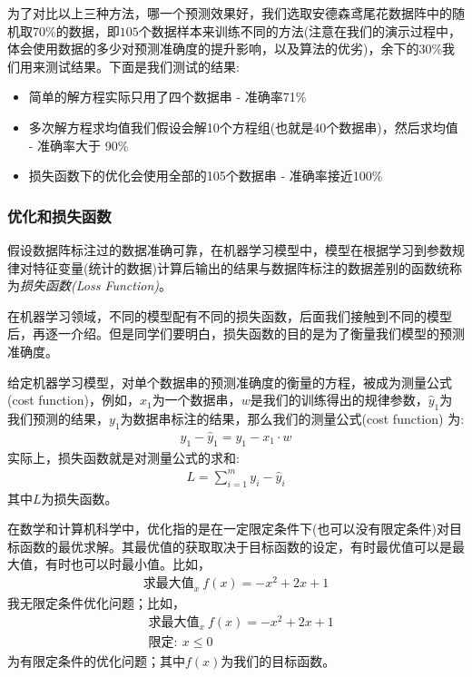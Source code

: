 \documentclass[12pt]{article}
\numberwithin{figure}{section}
\numberwithin{equation}{section}
\begin{document}
为了对比以上三种方法，哪一个预测效果好，我们选取安德森鸢尾花数据阵中的随机取70\%的数据，即$105$个数据样本来训练不同的方法(注意在我们的演示过程中，体会使用数据的多少对预测准确度的提升影响，以及算法的优劣)，余下的30\%我们用来测试结果。下面是我们测试的结果:
\begin{itemize}
	\item 简单的解方程实际只用了四个数据串 - 准确率71\%
	\item 多次解方程求均值我们假设会解10个方程组(也就是40个数据串)，然后求均值 - 准确率大于 90\%
	\item 损失函数下的优化会使用全部的105个数据串 - 准确率接近100\%
\end{itemize}

\subsubsection{优化和损失函数}

\begin{definition}
	假设数据阵标注过的数据准确可靠，在机器学习模型中，模型在根据学习到参数规律对特征变量(统计的数据)计算后输出的结果与数据阵标注的数据差别的函数统称为\textit{损失函数(Loss Function)}。
\end{definition}

\begin{remark}
在机器学习领域，不同的模型配有不同的损失函数，后面我们接触到不同的模型后，再逐一介绍。但是同学们要明白，损失函数的目的是为了衡量我们模型的预测准确度。	
\end{remark}

\begin{definition}
	给定机器学习模型，对单个数据串的预测准确度的衡量的方程，被成为测量公式(cost function)，例如，$x_1$为一个数据串，$w$是我们的训练得出的规律参数，$\hat{y}_1$为我们预测的结果，$y_1$为数据串标注的结果，那么我们的测量公式(cost function) 为:
	\begin{align*}
		y_1 - \hat{y}_1 = y_1 - x_1 \cdot w 
	\end{align*}
	实际上，损失函数就是对测量公式的求和:
	\begin{align*}
		L = \sum_{i=1}^m y_i - \hat{y}_i 
	\end{align*}
	其中$L$为损失函数。
\end{definition}

\begin{definition}
	在数学和计算机科学中，优化指的是在一定限定条件下(也可以没有限定条件)对目标函数的最优求解。其最优值的获取取决于目标函数的设定，有时最优值可以是最大值，有时也可以时最小值。比如，
	\begin{align*}
		\text{求最大值}_x \ f(x) = -x^2+2x + 1 
	\end{align*}
	我无限定条件优化问题；比如，
		\begin{align*}
		& \text{求最大值}_x \ f(x) = -x^2+2x + 1  \\
		& \text{限定}: \ x \leq 0 
	\end{align*}
	为有限定条件的优化问题；其中$f(x)$为我们的目标函数。
\end{definition}
\end{document}
